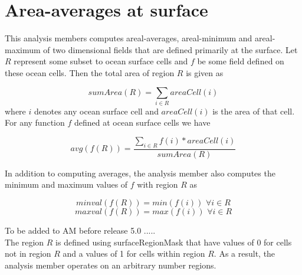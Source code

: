 \section{Area-averages at surface}
\label{sec:area_average_at_surface}

This analysis members computes areal-averages, areal-minimum and areal-maximum of two dimensional fields that are defined primarily at the surface. Let $R$ represent some subset to ocean surface cells and $f$ be some field defined on these ocean cells. Then the total area of region $R$ is given as

\begin{equation}
sumArea(R) = \sum_{i \in R} areaCell(i)
\end{equation}
where $i$ denotes any ocean surface cell and $areaCell(i)$ is the area of that cell. For any function $f$ defined at ocean surface cells we have

\begin{equation}
avg(f(R)) = \frac{\sum_{i \in R} f(i)*areaCell(i)}{sumArea(R)}
\end{equation}

In addition to computing averages, the analysis member also computes the minimum and maximum values of $f$ with region $R$ as

\begin{equation}
minval(f(R))=min(f(i)) \, \, \forall i \in R
\end{equation}
\begin{equation}
maxval(f(R))=max(f(i)) \, \, \forall i \in R
\end{equation}

{\noindent}To be added to AM before release 5.0 .....\\
The region $R$ is defined using surfaceRegionMask that have values of 0 for cells not in region $R$ and a values of 1 for cells within region $R$. As a result, the analysis member operates on an arbitrary number regions.
